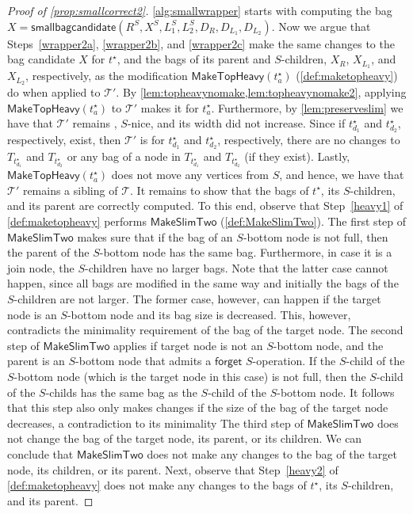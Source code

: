 \documentclass[a4paper,UKenglish,cleveref, autoref, thm-restate, numberwithinsect]{lipics-v2021}
\newcounter{modification}
\newcommand{\forget}{\mathsf{forget}}
\newcommand{\smallbagc}{\mathsf{smallbagcandidate}}
\newcommand{\slim}{\text{slim}\xspace}
\newcommand{\topheavy}{\text{top-heavy}\xspace}
\newcommand{\MakeSlimTwo}{\mathsf{MakeSlimTwo}}
\newcommand{\MakeTopHeavy}{\mathsf{MakeTopHeavy}}
\begin{document}
\begin{proof}[Proof of \cref{prop:smallcorrect2}]
\cref{alg:smallwrapper} starts with computing the bag $X=\smallbagc(R^S,X^S,L_1^S,L_2^S,D_R,D_{L_1},D_{L_2})$.
Now we argue that Steps~\ref{wrapper2a}, \ref{wrapper2b}, and \ref{wrapper2c} make the same changes to the bag candidate $X$ for ${t^{\star}}$, and the bags of its parent and $S$-children, $X_R$, $X_{L_1}$, and $X_{L_2}$, respectively, as the modification $\MakeTopHeavy(t^{\star}_a)$ (\cref{def:maketopheavy}) do when applied to $\mathcal{T}'$. 
By \cref{lem:topheavynomake,lem:topheavynomake2}, applying $\MakeTopHeavy(t^{\star}_a)$ to $\mathcal{T}'$ makes it \topheavy for $t^{\star}_a$. Furthermore, by \cref{lem:preserveslim} we have that $\mathcal{T}'$ remains \slim, $S$-nice, and its width did not increase. 
Since if $t^\star_{d_1}$ and $t^\star_{d_2}$, respectively, exist, then $\mathcal{T}'$ is \topheavy for $t^\star_{d_1}$ and $t^\star_{d_2}$, respectively, there are no changes to $T_{t^{\star}_{d_1}}$ and $T_{t^{\star}_{d_2}}$ or any bag of a node in $T_{t^{\star}_{d_1}}$ and $T_{t^{\star}_{d_2}}$ (if they exist).
Lastly, $\MakeTopHeavy(t^{\star}_a)$ does not move any vertices from $S$, and hence, we have that $\mathcal{T}'$ remains a sibling of $\mathcal{T}$. It remains to show that the bags of ${t^{\star}}$, its $S$-children, and its parent are correctly computed. 
To this end, observe that Step~\ref{heavy1} of \cref{def:maketopheavy} performs $\MakeSlimTwo$ (\cref{def:MakeSlimTwo}). 
The first step of $\MakeSlimTwo$ makes sure that if the bag of an $S$-bottom node is not full, then the parent of the $S$-bottom node has the same bag. Furthermore, in case it is a join node, the $S$-children have no larger bags. Note that the latter case cannot happen, since all bags are modified in the same way and initially the bags of the $S$-children are not larger. The former case, however, can happen if the target node is an $S$-bottom node and its bag size is decreased. This, however, contradicts the minimality requirement of the bag of the target node.
The second step of $\MakeSlimTwo$ applies if target node is not an $S$-bottom node, and the parent is an $S$-bottom node that admits a $\forget$ $S$-operation. 
If the $S$-child of the $S$-bottom node (which is the target node in this case) is not full, then the $S$-child of the $S$-childs has the same bag as the $S$-child of the $S$-bottom node. 
It follows that this step also only makes changes if the size of the bag of the target node decreases, a contradiction to its minimality
The third step of $\MakeSlimTwo$ does not change the bag of the target node, its parent, or its children.
We can conclude that $\MakeSlimTwo$ does not make any changes to the bag of the target node, its children, or its parent.
Next, observe that Step~\ref{heavy2} of \cref{def:maketopheavy} does not make any changes to the bags of ${t^{\star}}$, its $S$-children, and its parent.


\end{proof}
\end{document}
